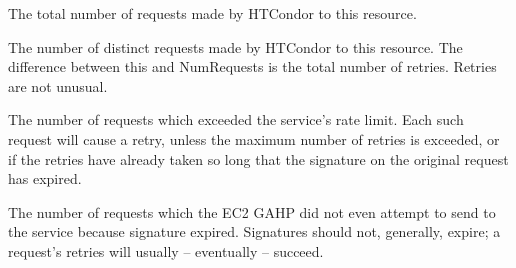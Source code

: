 \begin{description}

\item[\AdAttr{NumRequests}:]
The total number of requests made by HTCondor to this resource.

\item[\AdAttr{NumDistinctRequests}:]
The number of distinct requests made by HTCondor to this
resource.  The difference between this and NumRequests is
the total number of retries.  Retries are not unusual.

\item[\AdAttr{NumRequestsExceedingLimit}:]
The number of requests which exceeded the service's
rate limit.  Each such request will cause a retry, unless the maximum
number of retries is exceeded, or if the retries have already taken so
long that the signature on the original request has expired.

\item[\AdAttr{NumExpiredSignatures}:]
The number of requests which the EC2 GAHP did not even attempt
to send to the service because signature expired.  Signatures should not,
generally, expire; a request's retries will usually -- eventually -- succeed.

\end{description}
